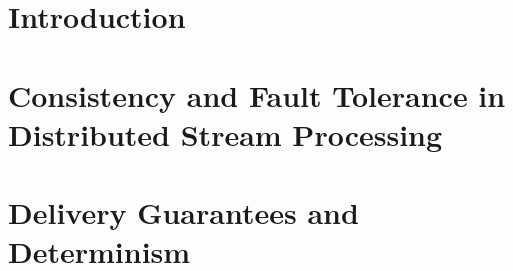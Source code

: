 \documentclass[a4paper, 12pt, oneside]{Thesis}  %
\theoremstyle{definition}
\begin{document}






\mainmatter	  %
\pagestyle{fancy}  %


\chapter{Introduction}

\chapter{Consistency and Fault Tolerance in Distributed Stream Processing}
\label{thesis-chapter-literature-review}


\chapter{Delivery Guarantees and Determinism}
\label{thesis-chapter-delivery-guarantees}

\end{document}
